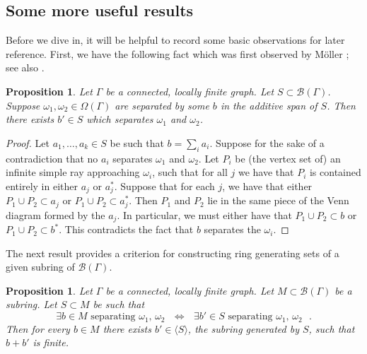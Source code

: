 \documentclass[11pt,a4paper]{amsart}
\newtheorem{proposition}[theorem]{Proposition}
\theoremstyle{definition}
\newcommand{\br}{{\mathscr{B}}}
\begin{document}
\subsection{Some more useful results}

Before we dive in, it will be helpful to record some basic observations for later reference. 
First, we have the following fact which was first observed by M\"oller \cite{mller1992ends}; see also \cite[Prop.~7.1]{thomassen1993vertex}.

\begin{proposition}\label{prop:separating-generators}
    Let $\Gamma$ be a connected, locally finite graph. Let $S \subset \br(\Gamma)$. Suppose $\omega_1, \omega_2 \in \Omega(\Gamma)$ are separated by some $b$ in the additive span of $S$. Then there exists $b' \in S$ which separates $\omega_1$ and $\omega_2$. 
\end{proposition}

\begin{proof}
    Let $a_1, \ldots, a_k \in S$ be such that $b = \sum_i a_i$. Suppose for the sake of a contradiction that no $a_i$ separates $\omega_1$ and $\omega_2$. Let $P_i$ be (the vertex set of) an infinite simple ray approaching $\omega_i$, such that for all $j$ we have that $P_i$ is contained entirely in either $a_j$ or $a_j^\ast$. Suppose that for each $j$, we have that either $P_1 \cup P_2 \subset a_j$ or $P_1 \cup P_2 \subset a_j^\ast$. Then $P_1$ and $P_2$ lie in the same piece of the Venn diagram formed by the $a_j$. In particular, we must either have that $P_1 \cup P_2 \subset b$ or $P_1 \cup P_2 \subset b^\ast$. This contradicts the fact that $b$ separates the $\omega_i$. 
\end{proof}

The next result provides a criterion for constructing ring generating sets of a given subring of $\br(\Gamma)$.

\begin{proposition}\label{prop:g-finite-criterion}
    Let $\Gamma$ be a connected, locally finite graph. Let $M \subset \br(\Gamma)$ be a subring. Let $S \subset M$ be such that
    $$
    \text{$\exists b \in M$ separating $\omega_1$, $\omega_2$ $\iff$ $\exists b' \in S$ separating $\omega_1$, $\omega_2$ }.
    $$
    Then for every $b \in M$ there exists $b' \in \langle S \rangle$, the subring generated by $S$, such that $b+b'$ is finite.
\end{proposition}
\end{document}
